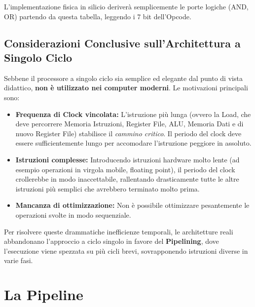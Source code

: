 \documentclass[12pt, a4paper]{article}
\begin{document}
L'implementazione fisica in silicio deriverà semplicemente le porte logiche (AND, OR) partendo da questa tabella, leggendo i 7 bit dell'Opcode.

\subsection{Considerazioni Conclusive sull'Architettura a Singolo Ciclo}
Sebbene il processore a singolo ciclo sia semplice ed elegante dal punto di vista didattico, \textbf{non è utilizzato nei computer moderni}. Le motivazioni principali sono:
\begin{itemize}
    \item \textbf{Frequenza di Clock vincolata:} L'istruzione più lunga (ovvero la Load, che deve percorrere Memoria Istruzioni, Register File, ALU, Memoria Dati e di nuovo Register File) stabilisce il \textit{cammino critico}. Il periodo del clock deve essere sufficientemente lungo per accomodare l'istruzione peggiore in assoluto.
    \item \textbf{Istruzioni complesse:} Introducendo istruzioni hardware molto lente (ad esempio operazioni in virgola mobile, floating point), il periodo del clock crollerebbe in modo inaccettabile, rallentando drasticamente tutte le altre istruzioni più semplici che avrebbero terminato molto prima.
    \item \textbf{Mancanza di ottimizzazione:} Non è possibile ottimizzare pesantemente le operazioni svolte in modo sequenziale. 
\end{itemize}
Per risolvere queste drammatiche inefficienze temporali, le architetture reali abbandonano l'approccio a ciclo singolo in favore del \textbf{Pipelining}, dove l'esecuzione viene spezzata su più cicli brevi, sovrapponendo istruzioni diverse in varie fasi.



\section{La Pipeline}
\end{document}
